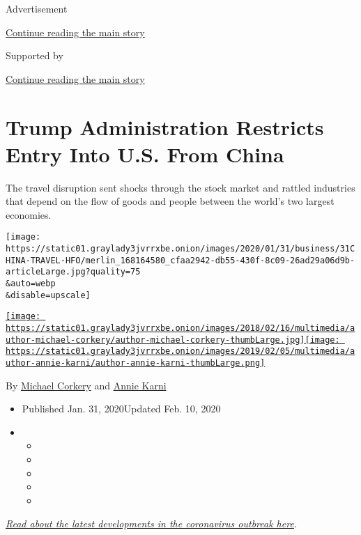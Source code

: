 Advertisement

\protect\hyperlink{after-top}{Continue reading the main story}

Supported by

\protect\hyperlink{after-sponsor}{Continue reading the main story}

\hypertarget{trump-administration-restricts-entry-into-us-from-china}{%
\section{Trump Administration Restricts Entry Into U.S. From
China}\label{trump-administration-restricts-entry-into-us-from-china}}

The travel disruption sent shocks through the stock market and rattled
industries that depend on the flow of goods and people between the
world's two largest economies.

\texttt{[image: https://static01.graylady3jvrrxbe.onion/images/2020/01/31/business/31CHINA-TRAVEL-HFO/merlin\_168164580\_cfaa2942-db55-430f-8c09-26ad29a06d9b-articleLarge.jpg?quality=75\\\&auto=webp\\\&disable=upscale]}

\href{https://www.nytimes3xbfgragh.onion/by/michael-corkery}{\texttt{[image: https://static01.graylady3jvrrxbe.onion/images/2018/02/16/multimedia/author-michael-corkery/author-michael-corkery-thumbLarge.jpg]}}\href{https://www.nytimes3xbfgragh.onion/by/annie-karni}{\texttt{[image: https://static01.graylady3jvrrxbe.onion/images/2019/02/05/multimedia/author-annie-karni/author-annie-karni-thumbLarge.png]}}

By \href{https://www.nytimes3xbfgragh.onion/by/michael-corkery}{Michael
Corkery} and
\href{https://www.nytimes3xbfgragh.onion/by/annie-karni}{Annie Karni}

\begin{itemize}
\item
  Published Jan. 31, 2020Updated Feb. 10, 2020
\item
  \begin{itemize}
  \item
  \item
  \item
  \item
  \item
  \end{itemize}
\end{itemize}

\href{https://www.nytimes3xbfgragh.onion/2020/02/02/world/asia/china-coronavirus.html}{\emph{Read
about the latest developments in the coronavirus outbreak here}}\emph{.}

